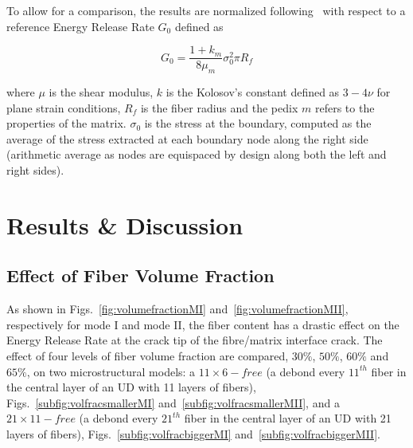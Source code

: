 \documentclass[review]{elsarticle}
\begin{document}
To allow for a comparison, the results are normalized following~\cite{Sandino2016} with respect to a reference Energy Release Rate $G_{0}$ defined as

\begin{equation}
G_{0}=\frac{1+k_{m}}{8\mu_{m}}\sigma_{0}^{2}\pi R_{f}
\end{equation}

where $\mu$ is the shear modulus, $k$ is the Kolosov's constant defined as $3-4\nu$ for plane strain conditions, $R_{f}$ is the fiber radius and the pedix $m$ refers to the properties of the matrix. $\sigma_{0}$ is the stress at the boundary, computed as the average of the stress extracted at each boundary node along the right side (arithmetic average as nodes are equispaced by design along both the left and right sides).

\section{Results \& Discussion}

\subsection{Effect of Fiber Volume Fraction}\label{subsec:volfrac}

As shown in Figs.~\ref{fig:volumefractionMI} and~\ref{fig:volumefractionMII}, respectively for mode I and mode II, the fiber content has a drastic effect on the Energy Release Rate at the crack tip of the fibre/matrix interface crack. The effect of four levels of fiber volume fraction are compared, $30\%$, $50\%$, $60\%$ and $65\%$, on two microstructural models: a $11\times 6-free$ (a debond every $11^{th}$ fiber in the central layer of an UD with 11 layers of fibers), Figs.~\ref{subfig:volfracsmallerMI} and~\ref{subfig:volfracsmallerMII}, and a $21\times 11-free$ (a debond every $21^{th}$ fiber in the central layer of an UD with 21 layers of fibers), Figs.~\ref{subfig:volfracbiggerMI} and~\ref{subfig:volfracbiggerMII}. 
\end{document}
